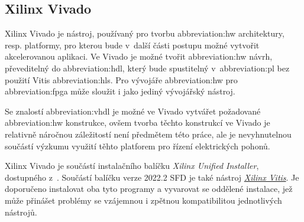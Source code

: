 \documentclass[a4paper, twoside, 11pt]{article}
\begin{document}
		\subsection{Xilinx Vivado}\label{subsec:xilinx-vivado}
			Xilinx Vivado je nástroj, používaný pro tvorbu \gls{abbreviation:hw} architektury, resp. platformy, pro kterou bude v~další části postupu možné vytvořit akcelerovanou aplikaci. Ve Vivado je možné tvořit \gls{abbreviation:hw} návrh, převeditelný do \gls{abbreviation:hdl}, který bude spustitelný v~\gls{abbreviation:pl} bez použití Vitis \gls{abbreviation:hls}. Pro vývojáře \gls{abbreviation:hw} pro \gls{abbreviation:fpga} může sloužit i jako jediný vývojářský nástroj.\par
			Se znalostí \gls{abbreviation:vhdl} je možné ve Vivado vytvářet požadované \gls{abbreviation:hw} konstrukce, ovšem tvorba těchto konstrukcí ve Vivado je relativně náročnou záležitostí není předmětem této práce, ale je nevyhnutelnou součástí výzkumu využití těhto platforem pro řízení elektrických pohonů.\par
			Xilinx Vivado je součástí instalačního balíčku \textit{Xilinx Unified Installer}, dostupného z~\cite{xilinx-downloads}. Součástí balíčku verze 2022.2 SFD je také nástroj \hyperref[subsec:xilinx-vitis]{\textit{Xilinx Vitis}}. Je doporučeno instalovat oba tyto programy a vyvarovat se oddělené instalace, jež může přinášet problémy se vzájemnou i zpětnou kompatibilitou jednotlivých nástrojů.
\end{document}
